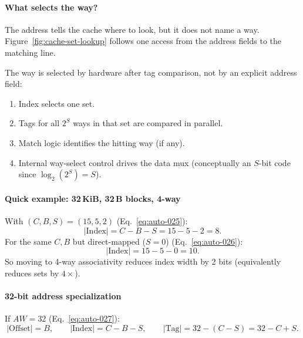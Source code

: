 \paragraph{What selects the way?}\label{par:auto-014}
The address tells the cache where to look, but it does not name a way.
Figure~\ref{fig:cache-set-lookup} follows one access from the address fields to the matching line.



The way is selected by hardware after tag comparison, not by an explicit address field:
\begin{enumerate}
    \item Index selects one set.
    \item Tags for all $2^S$ ways in that set are compared in parallel.
    \item Match logic identifies the hitting way (if any).
    \item Internal way-select control drives the data mux (conceptually an $S$-bit code since $\log_2(2^S)=S$).
\end{enumerate}

\paragraph{Quick example: 32\,KiB, 32\,B blocks, 4-way}\label{par:auto-015}
With $(C,B,S)=(15,5,2)$ (Eq.~\eqref{eq:auto-025}):
\begin{equation}\label{eq:auto-025}
    |\text{Index}|=C-B-S=15-5-2=8.
\end{equation}
For the same $C,B$ but direct-mapped ($S=0$) (Eq.~\eqref{eq:auto-026}):
\begin{equation}\label{eq:auto-026}
    |\text{Index}|=15-5-0=10.
\end{equation}
So moving to 4-way associativity reduces index width by 2 bits (equivalently reduces sets by $4\times$).

\paragraph{32-bit address specialization}\label{par:auto-016}
If $AW=32$ (Eq.~\eqref{eq:auto-027}):
\begin{equation}\label{eq:auto-027}
    |\text{Offset}|=B,\qquad
    |\text{Index}|=C-B-S,\qquad
    |\text{Tag}|=32-(C-S)=32-C+S.
\end{equation}


